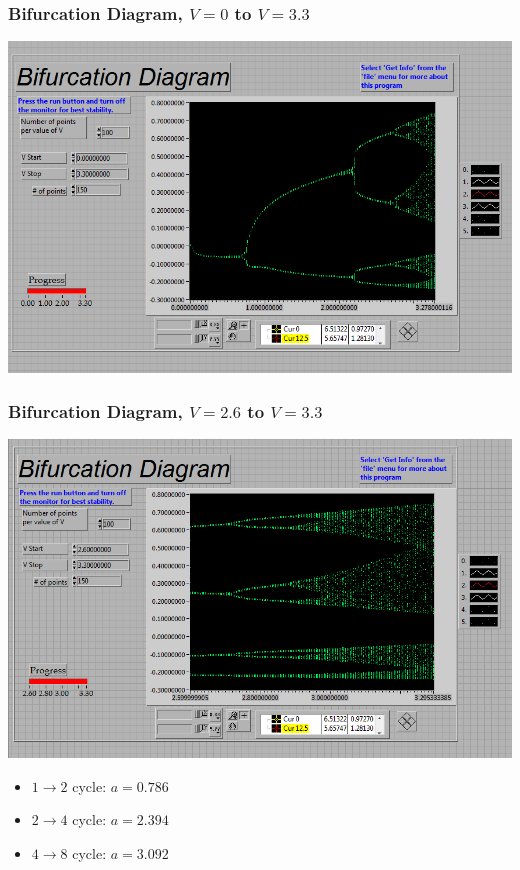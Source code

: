 \documentclass[9pt]{beamer}
\begin{document}
\begin{frame}
	\frametitle{Bifurcation Diagram, \( V = 0 \) to \( V = 3.3 \)} 

	\begin{center}
		\includegraphics[scale=0.4]{images/NLDBifr_0_3.3.PNG}
	\end{center}
\end{frame}

\begin{frame}
	\frametitle{Bifurcation Diagram, \( V = 2.6 \) to \( V = 3.3 \)}
	\begin{center}
		\includegraphics[scale=0.4]{images/NLDBifr_2.6_3.3.PNG}
	\end{center}

	\begin{itemize}
		\item \( 1 \to 2 \) cycle: \( a =  0.786 \)
		\item \( 2 \to 4 \) cycle: \( a = 2.394 \)
		\item \( 4 \to 8 \) cycle: \( a = 3.092 \)
	\end{itemize}
\end{frame}
\end{document}
